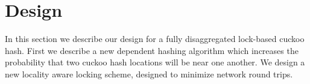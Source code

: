 \section{Design}

In this section we describe our design for a fully
disaggregated lock-based cuckoo hash. First we describe a
new dependent hashing algorithm which increases the
probability that two cuckoo hash locations will be near one
another. We design a new locality aware locking scheme,
designed to minimize network round trips.





\label{sec:design}

